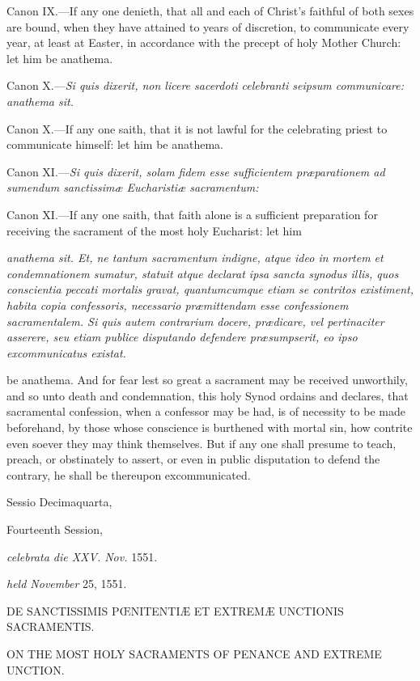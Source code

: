 Canon IX.—If any one denieth, that all and each of Christ's faithful of both sexes are bound, when they have attained to years of discretion, to communicate every year, at least at Easter, in accordance with the precept of holy Mother Church: let him be anathema.

Canon X.—\emph{Si quis dixerit, non licere sacerdoti celebranti seipsum communicare: anathema sit.}

Canon X.—If any one saith, that it is not lawful for the celebrating priest to communicate himself: let him be anathema.

Canon XI.—\emph{Si quis dixerit, solam fidem esse sufficientem præparationem ad sumendum sanctissimæ Eucharistiæ sacramentum: }

Canon XI.—If any one saith, that faith alone is a sufficient preparation for receiving the sacrament of the most holy Eucharist: let him

\emph{anathema sit. Et, ne tantum sacramentum indigne, atque ideo in mortem et condemnationem sumatur, statuit atque declarat ipsa sancta synodus illis, quos conscientia peccati mortalis gravat, quantumcumque etiam se contritos existiment, habita copia confessoris, necessario præmittendam esse confessionem sacramentalem. Si quis autem contrarium docere, prædicare, vel pertinaciter asserere, seu etiam publice disputando defendere præsumpserit, eo ipso excommunicatus existat.}

be anathema. And for fear lest so great a sacrament may be received unworthily, and so unto death and condemnation, this holy Synod ordains and declares, that sacramental confession, when a confessor may be had, is of necessity to be made beforehand, by those whose conscience is burthened with mortal sin, how contrite even soever they may think themselves. But if any one shall presume to teach, preach, or obstinately to assert, or even in public disputation to defend the contrary, he shall be thereupon excommunicated.


Sessio Decimaquarta,

Fourteenth Session,

\emph{celebrata die XXV. Nov.} 1551.

\emph{held November} 25, 1551.

DE SANCTISSIMIS PŒNITENTIÆ ET EXTREMÆ UNCTIONIS SACRAMENTIS.

ON THE MOST HOLY SACRAMENTS OF PENANCE AND EXTREME UNCTION.

